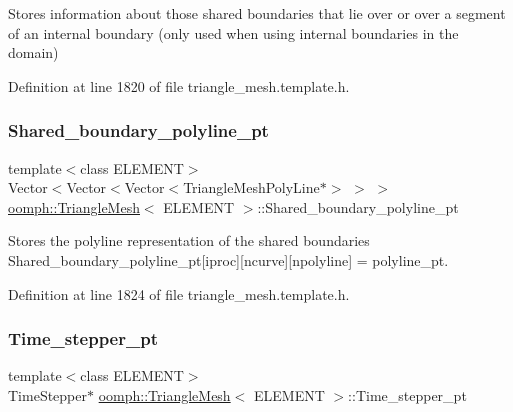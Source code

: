 Stores information about those shared boundaries that lie over or over a segment of an internal boundary (only used when using internal boundaries in the domain) 



Definition at line 1820 of file triangle\+\_\+mesh.\+template.\+h.

\mbox{\label{classoomph_1_1TriangleMesh_a88ca952f5e86d5cf5215811600ce6f0b}} 
\subsubsection{\texorpdfstring{Shared\+\_\+boundary\+\_\+polyline\+\_\+pt}{Shared\_boundary\_polyline\_pt}}
{\footnotesize\ttfamily template$<$class E\+L\+E\+M\+E\+NT$>$ \\
Vector$<$Vector$<$Vector$<$Triangle\+Mesh\+Poly\+Line$\ast$$>$ $>$ $>$ \hyperlink{classoomph_1_1TriangleMesh}{oomph\+::\+Triangle\+Mesh}$<$ E\+L\+E\+M\+E\+NT $>$\+::Shared\+\_\+boundary\+\_\+polyline\+\_\+pt\hspace{0.3cm}{\ttfamily [protected]}}



Stores the polyline representation of the shared boundaries Shared\+\_\+boundary\+\_\+polyline\+\_\+pt\mbox{[}iproc\mbox{]}\mbox{[}ncurve\mbox{]}\mbox{[}npolyline\mbox{]} = polyline\+\_\+pt. 



Definition at line 1824 of file triangle\+\_\+mesh.\+template.\+h.

\mbox{\label{classoomph_1_1TriangleMesh_a0478e2d31a2787eb4536bb61aa4bbbfd}} 
\subsubsection{\texorpdfstring{Time\+\_\+stepper\+\_\+pt}{Time\_stepper\_pt}}
{\footnotesize\ttfamily template$<$class E\+L\+E\+M\+E\+NT$>$ \\
Time\+Stepper$\ast$ \hyperlink{classoomph_1_1TriangleMesh}{oomph\+::\+Triangle\+Mesh}$<$ E\+L\+E\+M\+E\+NT $>$\+::Time\+\_\+stepper\+\_\+pt}



